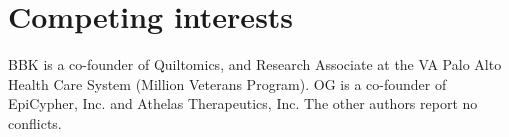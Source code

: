 \documentclass[letter]{bioinfo}
\begin{document}
	\section*{Competing interests}
	
	BBK is a co-founder of Quiltomics, and Research Associate at the VA Palo Alto Health Care System (Million Veterans Program).  OG is a co-founder of EpiCypher, Inc. and Athelas Therapeutics, Inc.  The other authors report no conflicts.\vspace*{-12pt} 
	
	
	
	
	
	
\end{document}
